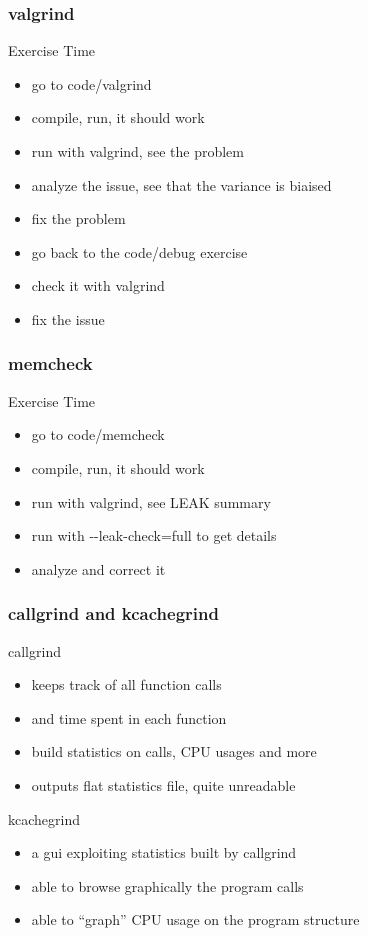 \begin{frame}[fragile]
  \frametitle{valgrind}
  \begin{alertblock}{Exercise Time}
    \begin{itemize}
    \item go to code/valgrind
    \item compile, run, it should work
    \item run with valgrind, see the problem
    \item analyze the issue, see that the variance is biaised
    \item fix the problem
      \vspace{.3cm}
    \item go back to the code/debug exercise
    \item check it with valgrind
    \item fix the issue
    \end{itemize}
  \end{alertblock}
\end{frame}

\begin{frame}[fragile]
  \frametitle{memcheck}
  \begin{alertblock}{Exercise Time}
    \begin{itemize}
    \item go to code/memcheck
    \item compile, run, it should work
    \item run with valgrind, see LEAK summary
    \item run with -{}-leak-check=full to get details
    \item analyze and correct it
    \end{itemize}
  \end{alertblock}
\end{frame}

\begin{frame}[fragile]
  \frametitle{callgrind and kcachegrind}
  \begin{block}{callgrind}
    \begin{itemize}
      \item keeps track of all function calls
      \item and time spent in each function
      \item build statistics on calls, CPU usages and more
      \item outputs flat statistics file, quite unreadable
    \end{itemize}
  \end{block}
  \begin{block}{kcachegrind}
    \begin{itemize}
      \item a gui exploiting statistics built by callgrind
      \item able to browse graphically the program calls
      \item able to ``graph'' CPU usage on the program structure
    \end{itemize}
  \end{block}
\end{frame}

